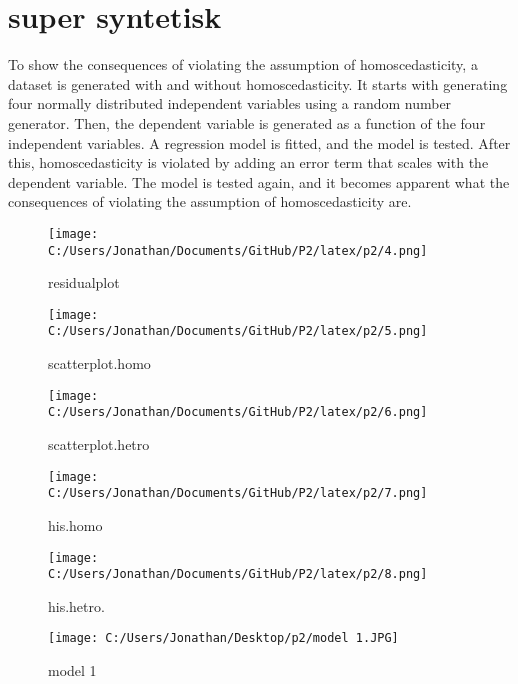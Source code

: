 \section{super syntetisk }

To show the consequences of violating the assumption of homoscedasticity, a dataset is generated with and without homoscedasticity. It starts with generating four normally distributed independent variables using a random number generator. Then, the dependent variable is generated as a function of the four independent variables. A regression model is fitted, and the model is tested. After this, homoscedasticity is violated by adding an error term that scales with the dependent variable. The model is tested again, and it becomes apparent what the consequences of violating the assumption of homoscedasticity are.





\begin{figure}[h] 
	\centering\texttt{[image: C:/Users/Jonathan/Documents/GitHub/P2/latex/p2/4.png]}
	\caption{residualplot}
	\label{fig:j06}
\end{figure}

\begin{figure}[h] 
	\centering\texttt{[image: C:/Users/Jonathan/Documents/GitHub/P2/latex/p2/5.png]}
	\caption{scatterplot.homo}
	\label{fig:j06}
\end{figure}

\begin{figure}[h] 
	\centering\texttt{[image: C:/Users/Jonathan/Documents/GitHub/P2/latex/p2/6.png]}
	\caption{scatterplot.hetro}
	\label{fig:j06}
\end{figure}

\begin{figure}[h] 
	\centering\texttt{[image: C:/Users/Jonathan/Documents/GitHub/P2/latex/p2/7.png]}
	\caption{his.homo}
	\label{fig:j06}
\end{figure}

\begin{figure}[h] 
	\centering
	\texttt{[image: C:/Users/Jonathan/Documents/GitHub/P2/latex/p2/8.png]}
	\caption{his.hetro.}
	\label{fig:j06}
\end{figure}


\begin{figure}[h] 
	\centering
	\texttt{[image: C:/Users/Jonathan/Desktop/p2/model 1.JPG]}
	\caption{model 1}
	\label{fig:j06}
\end{figure}

